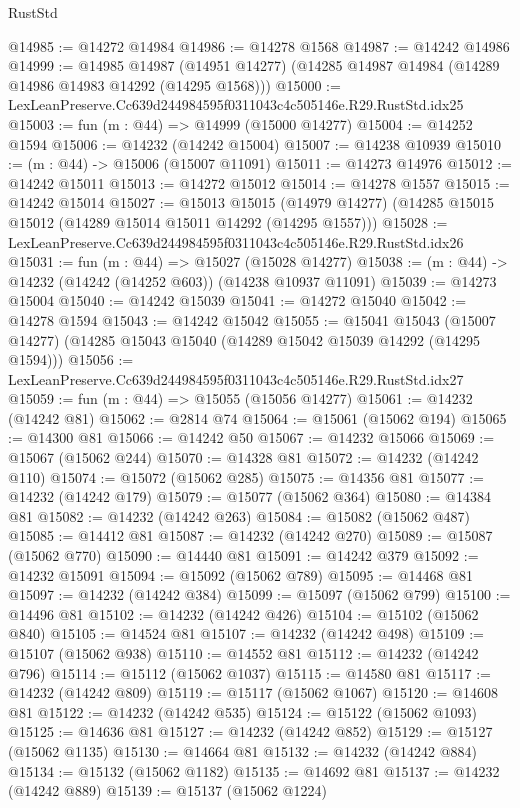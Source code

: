 \begin{lexlean}{RustStd}
\begin{coremodule}
@14985 := @14272 @14984
@14986 := @14278 @1568
@14987 := @14242 @14986
@14999 := @14985
    @14987
    (@14951 @14277)
    (@14285 @14987 @14984 (@14289 @14986 @14983 @14292 (@14295 @1568)))
@15000 := LexLeanPreserve.Cc639d244984595f0311043c4c505146e.R29.RustStd.idx25
@15003 := fun (m : @44) => @14999 (@15000 @14277)
@15004 := @14252 @1594
@15006 := @14232 (@14242 @15004)
@15007 := @14238 @10939
@15010 := (m : @44) -> @15006 (@15007 @11091)
@15011 := @14273 @14976
@15012 := @14242 @15011
@15013 := @14272 @15012
@15014 := @14278 @1557
@15015 := @14242 @15014
@15027 := @15013
    @15015
    (@14979 @14277)
    (@14285 @15015 @15012 (@14289 @15014 @15011 @14292 (@14295 @1557)))
@15028 := LexLeanPreserve.Cc639d244984595f0311043c4c505146e.R29.RustStd.idx26
@15031 := fun (m : @44) => @15027 (@15028 @14277)
@15038 := (m : @44) -> @14232 (@14242 (@14252 @603)) (@14238 @10937 @11091)
@15039 := @14273 @15004
@15040 := @14242 @15039
@15041 := @14272 @15040
@15042 := @14278 @1594
@15043 := @14242 @15042
@15055 := @15041
    @15043
    (@15007 @14277)
    (@14285 @15043 @15040 (@14289 @15042 @15039 @14292 (@14295 @1594)))
@15056 := LexLeanPreserve.Cc639d244984595f0311043c4c505146e.R29.RustStd.idx27
@15059 := fun (m : @44) => @15055 (@15056 @14277)
@15061 := @14232 (@14242 @81)
@15062 := @2814 @74
@15064 := @15061 (@15062 @194)
@15065 := @14300 @81
@15066 := @14242 @50
@15067 := @14232 @15066
@15069 := @15067 (@15062 @244)
@15070 := @14328 @81
@15072 := @14232 (@14242 @110)
@15074 := @15072 (@15062 @285)
@15075 := @14356 @81
@15077 := @14232 (@14242 @179)
@15079 := @15077 (@15062 @364)
@15080 := @14384 @81
@15082 := @14232 (@14242 @263)
@15084 := @15082 (@15062 @487)
@15085 := @14412 @81
@15087 := @14232 (@14242 @270)
@15089 := @15087 (@15062 @770)
@15090 := @14440 @81
@15091 := @14242 @379
@15092 := @14232 @15091
@15094 := @15092 (@15062 @789)
@15095 := @14468 @81
@15097 := @14232 (@14242 @384)
@15099 := @15097 (@15062 @799)
@15100 := @14496 @81
@15102 := @14232 (@14242 @426)
@15104 := @15102 (@15062 @840)
@15105 := @14524 @81
@15107 := @14232 (@14242 @498)
@15109 := @15107 (@15062 @938)
@15110 := @14552 @81
@15112 := @14232 (@14242 @796)
@15114 := @15112 (@15062 @1037)
@15115 := @14580 @81
@15117 := @14232 (@14242 @809)
@15119 := @15117 (@15062 @1067)
@15120 := @14608 @81
@15122 := @14232 (@14242 @535)
@15124 := @15122 (@15062 @1093)
@15125 := @14636 @81
@15127 := @14232 (@14242 @852)
@15129 := @15127 (@15062 @1135)
@15130 := @14664 @81
@15132 := @14232 (@14242 @884)
@15134 := @15132 (@15062 @1182)
@15135 := @14692 @81
@15137 := @14232 (@14242 @889)
@15139 := @15137 (@15062 @1224)

\end{coremodule}
\end{lexlean}
